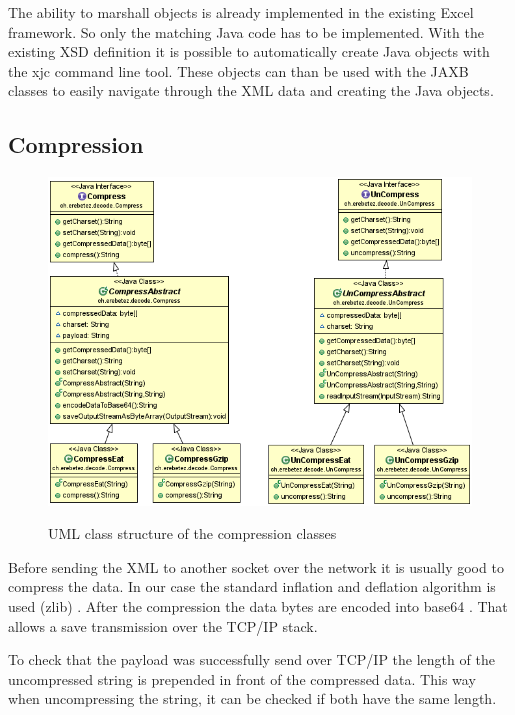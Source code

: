 \documentclass[paper=a4,twoside=false,BCOR=0mm,DIV=calc,fontsize=12pt]{scrartcl}
\begin{document}
The ability to marshall objects is already implemented in the existing Excel framework. So only the matching Java code has to be implemented.
With the existing XSD definition it is possible to automatically create Java objects with the xjc \cite{xjc} command line tool.
These objects can than be used with the JAXB \cite{jaxb} classes to easily navigate through the XML data and creating the Java objects.



\subsection{Compression}
\begin{figure}
    \begin{center}
      \includegraphics[width=1\textwidth]{./img/uml_decode_model.png}\\
    \end{center}
  \caption{UML class structure of the compression classes}
  \label{compressionClassUml}
\end{figure} 

Before sending the XML to another socket over the network it is usually good to compress the data.
In our case the standard inflation and deflation algorithm is used (zlib) \cite{zlib}. After the compression 
the data bytes are encoded into base64 \cite{base64}. That allows a save transmission over the TCP/IP stack.

To check that the payload was successfully send over TCP/IP the length of the uncompressed string is prepended in front of the compressed data. This way when uncompressing the string, it can be checked if both have the same length. 
\end{document}
